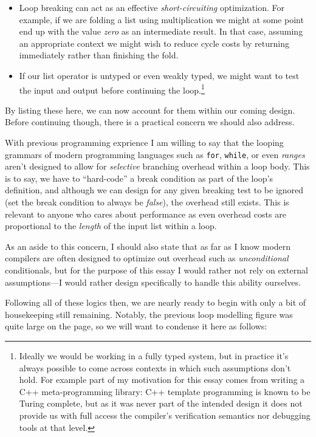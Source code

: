 \documentclass[twoside]{article}
\begin{document}
\begin{itemize}
\item Loop breaking can act as an effective \emph{short-circuiting} optimization. For example, if we are folding a list using
multiplication we might at some point end up with the value \emph{zero} as an intermediate result. In that case, assuming
an appropriate context we might wish to reduce cycle costs by returning immediately rather than finishing the fold.
\item If our list operator is untyped or even weakly typed, we might want to test the input and output before continuing the
loop.\footnote{Ideally we would be working in a fully typed system, but in practice it's always possible to come across contexts
in which such assumptions don't hold. For example part of my motivation for this essay comes from writing a C++ meta-programming
library: C++ template programming is known to be Turing complete, but as it was never part of the intended design it does not
provide us with full access the compiler's verification semantics nor debugging tools at that level.}
\end{itemize}
By listing these here, we can now account for them within our coming design. Before continuing though, there is a practical
concern we should also address.

With previous programming exprience I am willing to say that the looping grammars of modern programming languages such as
\texttt{for}, \texttt{while}, or even \emph{ranges} aren't designed to allow for \emph{selective} branching overhead within
a loop body. This is to say, we have to ``hard-code'' a break condition as part of the loop's definition, and although we
can design for any given breaking test to be ignored (set the break condition to always be \emph{false}), the overhead still
exists. This is relevant to anyone who cares about performance as even overhead costs are proportional to the \emph{length}
of the input list within a loop.

As an aside to this concern, I should also state that as far as I know modern compilers are often designed to optimize out
overhead such as \emph{unconditional} conditionals, but for the purpose of this essay I would rather not rely on external
assumptions---I would rather design specifically to handle this ability ourselves.

Following all of these logics then, we are nearly ready to begin with only a bit of housekeeping still remaining. Notably,
the previous loop modelling figure was quite large on the page, so we will want to condense it here as follows:
\end{document}
